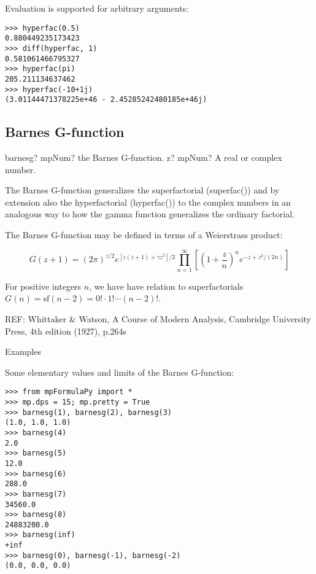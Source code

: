 Evaluation is supported for arbitrary arguments:

\begin{lstlisting}
>>> hyperfac(0.5)
0.880449235173423
>>> diff(hyperfac, 1)
0.581061466795327
>>> hyperfac(pi)
205.211134637462
>>> hyperfac(-10+1j)
(3.01144471378225e+46 - 2.45285242480185e+46j)
\end{lstlisting}


\subsection{Barnes G-function}

\begin{mpFunctionsExtract}
	\mpFunctionOne
	{barnesg? mpNum? the Barnes G-function.}
	{z? mpNum? A real or complex number.}
\end{mpFunctionsExtract}

\vpara
The Barnes G-function generalizes the superfactorial (superfac()) and by extension also the hyperfactorial (hyperfac()) to the complex numbers in an analogous way to how the gamma function generalizes the ordinary factorial.

\vpara
The Barnes G-function may be defined in terms of a Weierstrass product:

\begin{equation}
G(z+1)=(2\pi)^{z/2} e^{[z(z+1)+\gamma z^2]/2} \prod_{n=1}^{\infty}\left[ \left(1+\frac{z}{n}  \right)^n  e^{-z+z^2 /(2n)} \right]
\end{equation}

For positive integers $n$, we have have relation to superfactorials $G(n)=\text{sf}(n-2) = 0! \cdot 1! \cdots (n-2)!$.

REF: Whittaker \& Watson, A Course of Modern Analysis, Cambridge University Press,
4th edition (1927), p.264s

Examples

Some elementary values and limits of the Barnes G-function:

\begin{lstlisting}
>>> from mpFormulaPy import *
>>> mp.dps = 15; mp.pretty = True
>>> barnesg(1), barnesg(2), barnesg(3)
(1.0, 1.0, 1.0)
>>> barnesg(4)
2.0
>>> barnesg(5)
12.0
>>> barnesg(6)
288.0
>>> barnesg(7)
34560.0
>>> barnesg(8)
24883200.0
>>> barnesg(inf)
+inf
>>> barnesg(0), barnesg(-1), barnesg(-2)
(0.0, 0.0, 0.0)
\end{lstlisting}






